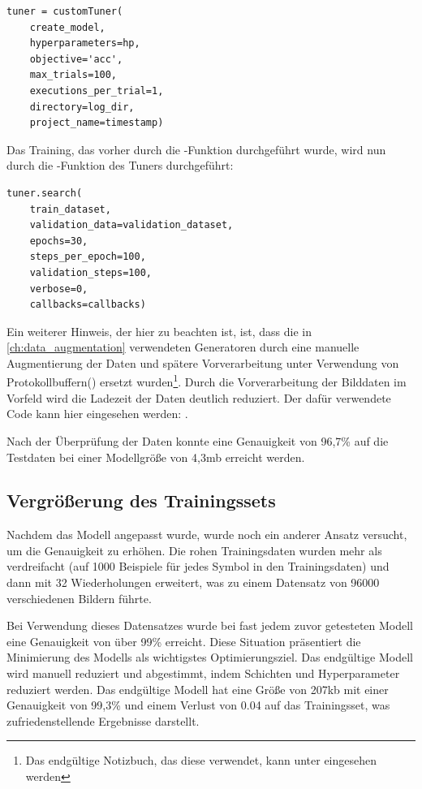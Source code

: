 \begin{lstlisting}
tuner = customTuner(
    create_model,
    hyperparameters=hp,
    objective='acc',
    max_trials=100,
    executions_per_trial=1,
    directory=log_dir,
    project_name=timestamp)
\end{lstlisting}

Das Training, das vorher durch die -Funktion durchgeführt wurde, wird nun durch die -Funktion des Tuners durchgeführt:

\begin{lstlisting}
tuner.search(
    train_dataset,
    validation_data=validation_dataset,
    epochs=30,
    steps_per_epoch=100,
    validation_steps=100,
    verbose=0,
    callbacks=callbacks)
\end{lstlisting}

Ein weiterer Hinweis, der hier zu beachten ist, ist, dass die in \ref{ch:data_augmentation} verwendeten Generatoren durch eine manuelle Augmentierung der Daten und spätere Vorverarbeitung unter Verwendung von Protokollbuffern() ersetzt wurden\footnote{Das endgültige Notizbuch, das diese verwendet, kann unter  eingesehen werden}.
Durch die Vorverarbeitung der Bilddaten im Vorfeld wird die Ladezeit der Daten deutlich reduziert.
Der dafür verwendete Code kann hier eingesehen werden: .

Nach der Überprüfung der Daten konnte eine Genauigkeit von 96,7\% auf die Testdaten bei einer Modellgröße von 4,3mb erreicht werden.

\subsection{Vergrößerung des Trainingssets}

Nachdem das Modell angepasst wurde, wurde noch ein anderer Ansatz versucht, um die Genauigkeit zu erhöhen.
Die rohen Trainingsdaten wurden mehr als verdreifacht (auf 1000 Beispiele für jedes Symbol in den Trainingsdaten) und dann mit 32 Wiederholungen erweitert, was zu einem Datensatz von 96000 verschiedenen Bildern führte.

Bei Verwendung dieses Datensatzes wurde bei fast jedem zuvor getesteten Modell eine Genauigkeit von über 99\% erreicht.
Diese Situation präsentiert die Minimierung des Modells als wichtigstes Optimierungsziel.
Das endgültige Modell wird manuell reduziert und abgestimmt, indem Schichten und Hyperparameter reduziert werden.
Das endgültige Modell hat eine Größe von 207kb mit einer Genauigkeit von 99,3\% und einem Verlust von 0.04 auf das Trainingsset, was zufriedenstellende Ergebnisse darstellt.

